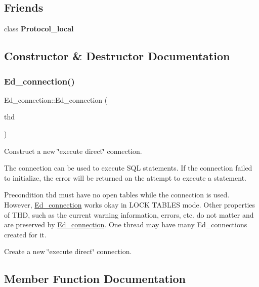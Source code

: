 \subsection*{Friends}
\begin{DoxyCompactItemize}
\item 
\mbox{\label{classEd__connection_a9c7f8d2a3f98c0505dc714383b23aecd}} 
class {\bfseries Protocol\+\_\+local}
\end{DoxyCompactItemize}


\subsection{Constructor \& Destructor Documentation}
\mbox{\label{classEd__connection_a31ae0e49095b5784dcccc495d6e2bcfe}} 
\subsubsection{\texorpdfstring{Ed\+\_\+connection()}{Ed\_connection()}}
{\footnotesize\ttfamily Ed\+\_\+connection\+::\+Ed\+\_\+connection (\begin{DoxyParamCaption}\item[{T\+HD $\ast$}]{thd }\end{DoxyParamCaption})}

Construct a new \char`\"{}execute direct\char`\"{} connection.

The connection can be used to execute S\+QL statements. If the connection failed to initialize, the error will be returned on the attempt to execute a statement.

\begin{DoxyPrecond}{Precondition}
thd must have no open tables while the connection is used. However, \mbox{\hyperlink{classEd__connection}{Ed\+\_\+connection}} works okay in L\+O\+CK T\+A\+B\+L\+ES mode. Other properties of T\+HD, such as the current warning information, errors, etc. do not matter and are preserved by \mbox{\hyperlink{classEd__connection}{Ed\+\_\+connection}}. One thread may have many Ed\+\_\+connections created for it.
\end{DoxyPrecond}
Create a new \char`\"{}execute direct\char`\"{} connection. 

\subsection{Member Function Documentation}
\mbox{\label{classEd__connection_a58f9da6381da4bc1455d7f22d1620d2d}} 
